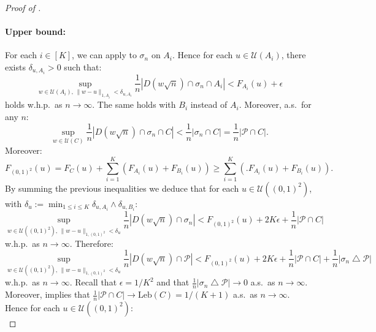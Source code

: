 \documentclass{article}
\theoremstyle{remark}
\newcommand{\card}[1]{\left|#1\right|}
\def\Leb{\mathrm{Leb}}
\def\opencarre{(0,1)^2}
\def\pts{\mathcal{P}}
\def\Usjo{\mathcal{U}}
\begin{document}
\begin{proof}[Proof of ]
    \paragraph{Upper bound:}
    For each $i\in[K]$, we can apply  to $\sigma_n$ on $A_i$.
    Hence for each $u\in\Usjo(A_i)$, there exists $\delta_{u,A_i}>0$ such that:
    \begin{equation*}
        \sup_{w\in\Usjo(A_i),\, \lVert w-u\rVert_{1,A_i} <\delta_{u,A_i}} \frac1n \card{D(w\sqrt n)\cap\sigma_n\cap A_i} < F_{A_i}(u) + \epsilon
    \end{equation*}
    holds w.h.p.~as $n\to\infty$.
    The same holds with $B_i$ instead of $A_i$.
    Moreover, a.s.~for any $n$:
    \begin{equation*}
        \sup_{w\in\Usjo(C)} \frac1n \card{D(w\sqrt n)\cap\sigma_n\cap C} < \frac1n \card{\sigma_n\cap C} = \frac1n \card{\pts\cap C} .
    \end{equation*}
    Moreover:
    \begin{equation*}
        F_{\opencarre}(u) = F_C(u) + \sum_{i=1}^K (F_{A_i}(u) + F_{B_i}(u)) \ge \sum_{i=1}^K \left(\big. F_{A_i}(u) + F_{B_i}(u) \right) .
    \end{equation*}
    By summing the previous inequalities we deduce that for each $u\in\Usjo\left(\opencarre\right)$, with $\delta_u := \min_{1\le i\le K} \delta_{u,A_i}\wedge\delta_{u,B_i}$:
    \begin{equation*}
        \sup_{w\in\Usjo\left(\opencarre\right),\, \lVert w-u\rVert_{1,\opencarre} <\delta_u} \frac1n \card{D(w\sqrt n)\cap\sigma_n} < F_{\opencarre}(u) + 2K\epsilon + \frac1n \card{\pts\cap C}
    \end{equation*}
    w.h.p.~as $n\to\infty$.
    Therefore:
    \begin{equation*}
        \sup_{w\in\Usjo\left(\opencarre\right),\, \lVert w-u\rVert_{1,\opencarre} <\delta_u} \frac1n \card{D(w\sqrt n)\cap\pts} < F_{\opencarre}(u) + 2K\epsilon + \frac1n \card{\pts\cap C} + \frac1n \card{\sigma_n\bigtriangleup\pts}
    \end{equation*}
    w.h.p.~as $n\to\infty$. 
    Recall that $\epsilon = 1/K^2$ and that $\frac1n \card{\sigma_n\bigtriangleup\pts} \to 0$ a.s.~as $n\to\infty$.
    Moreover,  implies that $\frac1n \card{\pts\cap C} \to \Leb(C) = 1/(K+1)$ a.s.~as $n\to\infty$. 
    Hence for each $u\in\Usjo\left(\opencarre\right)$:
    \begin{equation*}\label{eq: open local upper bound Sjo}

\end{equation*}
\end{proof}
\end{document}
